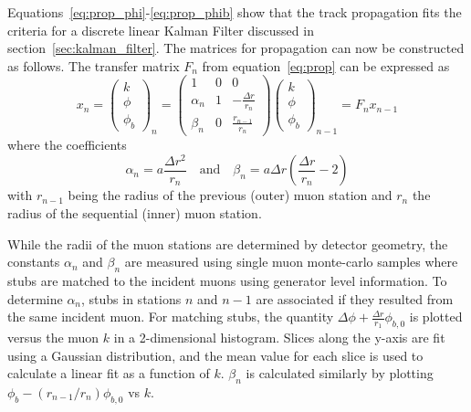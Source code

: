 Equations~\ref{eq:prop_phi}-\ref{eq:prop_phib} show that the track propagation fits the criteria for a discrete linear Kalman Filter discussed in section~\ref{sec:kalman_filter}. The matrices for propagation can now be constructed as follows. The transfer matrix $F_n$ from equation~\ref{eq:prop} can be expressed as
\begin{equation}
	\label{eq:kmtfProp}
	x_{n}=\left(\begin{matrix}
		k\\
		\phi\\
		\phi_b
	\end{matrix}\right)_{n} = 
\left(\begin{matrix}
	1 & 0 & 0\\
	\alpha_n & 1 & -\frac{\Delta r}{r_n}\\
	\beta_n & 0 & \frac{r_{n-1}}{r_n}
\end{matrix}\right)
\left(\begin{matrix}
	k\\
	\phi\\
	\phi_b
\end{matrix}\right)_{n-1}=F_nx_{n-1}
\end{equation}
where the coefficients
\begin{equation}
	\label{eq:kmtf_coeff}
	\alpha_n=a\frac{\Delta r^2}{r_n} \quad \mathrm{and} \quad \beta_n=a\Delta r\left(\frac{\Delta r}{r_n}-2\right)
\end{equation}
with $r_{n-1}$ being the radius of the previous (outer) muon station and $r_n$ the radius of the sequential (inner) muon station.

While the radii of the muon stations are determined by detector geometry, the constants $\alpha_n$ and $\beta_n$ are measured using single muon monte-carlo samples where stubs are matched to the incident muons using generator level information. To determine $\alpha_n$, stubs in stations $n$ and $n-1$ are associated if they resulted from the same incident muon. For matching stubs, the quantity $\Delta\phi+\frac{\Delta r}{r_1}\phi_{b,0}$ is plotted versus the muon $k$ in a 2-dimensional histogram. Slices along the y-axis are fit using a Gaussian distribution, and the mean value for each slice is used to calculate a linear fit as a function of $k$. $\beta_n$ is calculated similarly by plotting $\phi_b-\left(r_{n-1}/r_n\right)\phi_{b,0}$ vs $k$.


